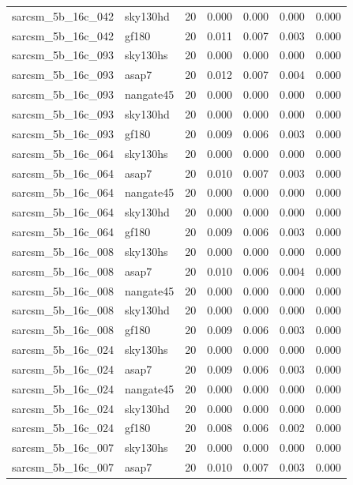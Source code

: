 \begin{tabular}{llrrrrr}
sarcsm\_5b\_16c\_042 & sky130hd & 20 & 0.000 & 0.000 & 0.000 & 0.000 \\
sarcsm\_5b\_16c\_042 & gf180 & 20 & 0.011 & 0.007 & 0.003 & 0.000 \\
sarcsm\_5b\_16c\_093 & sky130hs & 20 & 0.000 & 0.000 & 0.000 & 0.000 \\
sarcsm\_5b\_16c\_093 & asap7 & 20 & 0.012 & 0.007 & 0.004 & 0.000 \\
sarcsm\_5b\_16c\_093 & nangate45 & 20 & 0.000 & 0.000 & 0.000 & 0.000 \\
sarcsm\_5b\_16c\_093 & sky130hd & 20 & 0.000 & 0.000 & 0.000 & 0.000 \\
sarcsm\_5b\_16c\_093 & gf180 & 20 & 0.009 & 0.006 & 0.003 & 0.000 \\
sarcsm\_5b\_16c\_064 & sky130hs & 20 & 0.000 & 0.000 & 0.000 & 0.000 \\
sarcsm\_5b\_16c\_064 & asap7 & 20 & 0.010 & 0.007 & 0.003 & 0.000 \\
sarcsm\_5b\_16c\_064 & nangate45 & 20 & 0.000 & 0.000 & 0.000 & 0.000 \\
sarcsm\_5b\_16c\_064 & sky130hd & 20 & 0.000 & 0.000 & 0.000 & 0.000 \\
sarcsm\_5b\_16c\_064 & gf180 & 20 & 0.009 & 0.006 & 0.003 & 0.000 \\
sarcsm\_5b\_16c\_008 & sky130hs & 20 & 0.000 & 0.000 & 0.000 & 0.000 \\
sarcsm\_5b\_16c\_008 & asap7 & 20 & 0.010 & 0.006 & 0.004 & 0.000 \\
sarcsm\_5b\_16c\_008 & nangate45 & 20 & 0.000 & 0.000 & 0.000 & 0.000 \\
sarcsm\_5b\_16c\_008 & sky130hd & 20 & 0.000 & 0.000 & 0.000 & 0.000 \\
sarcsm\_5b\_16c\_008 & gf180 & 20 & 0.009 & 0.006 & 0.003 & 0.000 \\
sarcsm\_5b\_16c\_024 & sky130hs & 20 & 0.000 & 0.000 & 0.000 & 0.000 \\
sarcsm\_5b\_16c\_024 & asap7 & 20 & 0.009 & 0.006 & 0.003 & 0.000 \\
sarcsm\_5b\_16c\_024 & nangate45 & 20 & 0.000 & 0.000 & 0.000 & 0.000 \\
sarcsm\_5b\_16c\_024 & sky130hd & 20 & 0.000 & 0.000 & 0.000 & 0.000 \\
sarcsm\_5b\_16c\_024 & gf180 & 20 & 0.008 & 0.006 & 0.002 & 0.000 \\
sarcsm\_5b\_16c\_007 & sky130hs & 20 & 0.000 & 0.000 & 0.000 & 0.000 \\
sarcsm\_5b\_16c\_007 & asap7 & 20 & 0.010 & 0.007 & 0.003 & 0.000 \\

\end{tabular}
